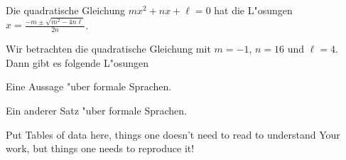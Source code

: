 \documentclass[twoside,a4paper,ger]{master}
\begin{document}
\lipsum[5]


\lipsum[6]

\begin{Theorem}
Die quadratische Gleichung \(mx^{2}+nx+\ell=0\) hat die L"osungen
\(x=\frac{-m\pm\sqrt{m^{2}-4n\ell}}{2n}\).
\end{Theorem}

\lipsum[7]

\begin{Beispiel}
Wir betrachten die quadratische Gleichung mit \(m=-1\), \(n=16\) und \(\ell=4\).
Dann gibt es folgende L"osungen
\end{Beispiel}

\lipsum[8]

\begin{Lemma}[Parikh]
Eine Aussage "uber formale Sprachen.
\end{Lemma}

\lipsum[9]

\begin{Satz}
Ein anderer Satz "uber formale Sprachen.
\end{Satz}


\lipsum[10]


\lipsum[11]


\newpage
\small


\normalsize


\appendix
\noappendicestocpagenum
\addappheadtotoc


Put Tables of data here, things one doesn't need to read to understand Your
work, but things one needs to reproduce it!


\lipsum[9]

\Assertion
\end{document}
